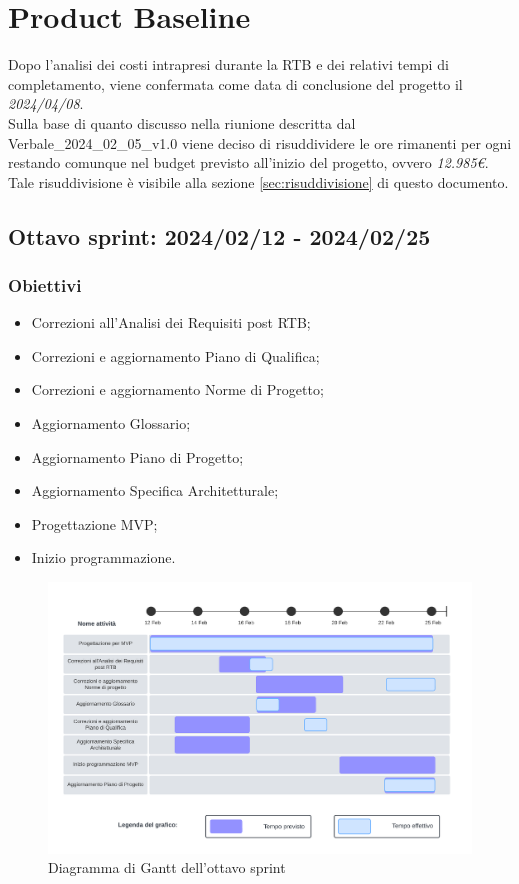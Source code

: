 \section{Product Baseline}
Dopo l'analisi dei costi intrapresi durante la RTB e dei relativi tempi di completamento, viene confermata come data di conclusione del progetto il \textit{2024/04/08}.\\Sulla base di quanto discusso nella riunione descritta dal Verbale\_2024\_02\_05\_v1.0 viene deciso di risuddividere le ore rimanenti per ogni  restando comunque nel budget previsto all'inizio del progetto, ovvero \textit{12.985€}.\\Tale risuddivisione è visibile alla sezione \ref{sec:risuddivisione} di questo documento.
\newpage

\subsection{Ottavo sprint: 2024/02/12 - 2024/02/25}
\subsubsection{Obiettivi}
\begin{itemize}
    \item Correzioni all'Analisi dei Requisiti post RTB;
    \item Correzioni e aggiornamento Piano di Qualifica;
    \item Correzioni e aggiornamento Norme di Progetto;
    \item Aggiornamento Glossario;
    \item Aggiornamento Piano di Progetto;
    \item Aggiornamento Specifica Architetturale;
    \item Progettazione MVP;
    \item Inizio programmazione.
\end{itemize}

\begin{figure}[h!]
    \centering  
    \includegraphics[width=\textwidth]{Roadmap8sprint.png}
    \caption{Diagramma di Gantt dell'ottavo sprint}
    \label{fig:roadmap8s}
\end{figure}
\newpage

